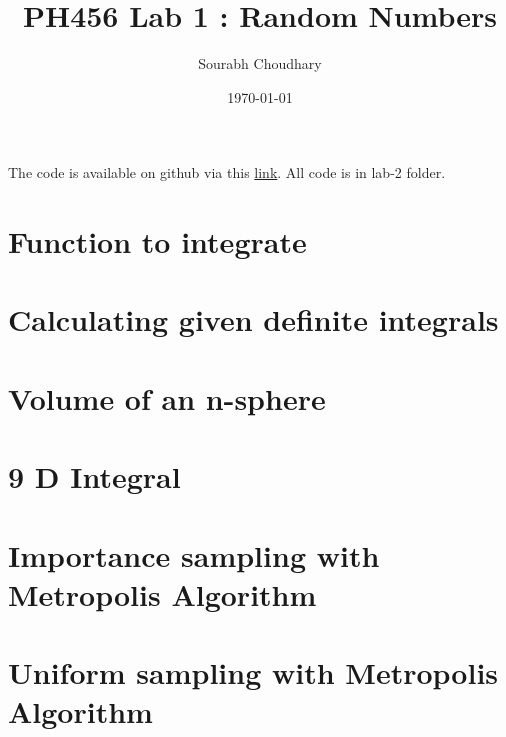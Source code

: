 \documentclass{article}
\title{PH456 Lab 1 : Random Numbers} %
\author{Sourabh Choudhary} %
\date{\today} %
\begin{document}

\maketitle %

The code is available on github via this \href{https://github.com/sourabh-ch/ph456-computational}{link}. 
All code is in lab-2 folder.

\section{Function to integrate}

\section{Calculating given definite integrals}

\section{Volume of an n-sphere}

\section{9 D Integral}

\section{Importance sampling with Metropolis Algorithm}

\section{Uniform sampling with Metropolis Algorithm}
\end{document}
